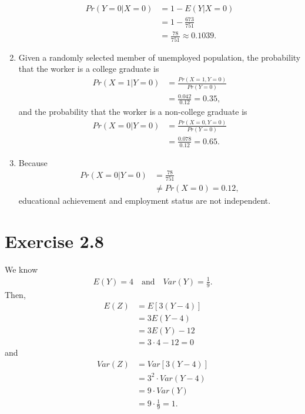 \documentclass[
]{book}
\begin{document}
\begin{enumerate}
  \begin{align}
        Pr(Y = 0 \lvert X = 0)
        & = 1 - E(Y \lvert X = 0) \\
        & = 1 - \frac{673}{751}  \\
        & = \frac{78}{751}
          \approx 0.1039.
    \end{align}
\item
  Given a randomly selected member of unemployed population, the probability that the worker is a college graduate is
  \begin{align}
        Pr(X = 1 \lvert Y = 0)
        & = \frac{Pr(X = 1, Y = 0)}{Pr(Y = 0)} \\
        & = \frac{0.042}{0.12} 
          = 0.35,
    \end{align}
  and the probability that the worker is a non-college graduate is
  \begin{align}
        Pr(X = 0 \lvert Y = 0)
        & = \frac{Pr(X = 0, Y = 0)}{Pr(Y = 0)} \\
        & = \frac{0.078}{0.12} 
          = 0.65.
    \end{align}
\item
  Because
  \begin{align}
        Pr(X = 0\lvert Y = 0)
        & = \frac{78}{751} \\
        & \neq Pr(X = 0) = 0.12,
    \end{align}
  educational achievement and employment status are not independent.
\end{enumerate}

\hypertarget{exercise-2.8}{%
\section{Exercise 2.8}\label{exercise-2.8}}

We know
\begin{align}
    E(Y) = 4 \quad \mbox{and} \quad Var(Y) = \frac{1}{9}.
\end{align}
Then,
\begin{align}
    E(Z) 
    & = E\left[ 3(Y - 4) \right] \\
    & = 3E(Y - 4) \\
    & = 3E(Y) - 12 \\
    & = 3\cdot 4 - 12 = 0
\end{align}
and
\begin{align}
    Var(Z)
    & = Var\left[ 3(Y - 4) \right] \\
    & = 3^2 \cdot Var(Y - 4) \\
    & = 9\cdot Var(Y) \\
    & = 9\cdot \frac{1}{9}
      = 1.
\end{align}
\end{document}
